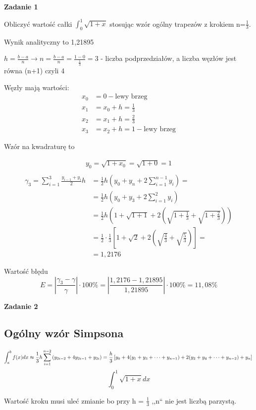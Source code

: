 \documentclass[11pt, a4paper]{article}
\begin{document}
\textbf{Zadanie 1}

Obliczyć wartość całki $\int_0^1\sqrt{1+x}$ stosując wzór ogólny trapezów z krokiem n=$\frac{1}{3}$.


Wynik analityczny to 1,21895

$h=\frac{b-a}{n}\rightarrow n=\frac{b-a}{n}=\frac{1-0}{\frac{1}{3}}=3$ - liczba podprzedziałów,
a liczba węzłów jest równa (n+1) czyli 4

Węzły mają wartości:
\begin{align*}
x_0&=0 - \text{lewy brzeg}\\
x_1&=x_0+h=\frac{1}{3}\\
x_2&=x_1+h=\frac{2}{3}\\
x_3&=x_2+h=1 - \text{lewy brzeg}
\end{align*}

Wzór na kwadraturę to

\begin{gather*}
y_0=\sqrt{1+x_0}=\sqrt{1+0}=1\\
\end{gather*}
\begin{align*}
\gamma_3=\sum_{i=1}^3\frac{y_{i-1}+y_i}{2}h&=\frac{1}{2}h\left(y_0+y_n+2\sum_{i=1}^{n-1}y_i\right)=\\
&=\frac{1}{2}h\left(y_0+y_3+2\sum_{i=1}^2y_i\right)\\
&=\frac{1}{2}h\left(1+\sqrt{1+1}+2\left(\sqrt{1+\frac{1}{3}}+\sqrt{1+\frac{2}{3}}\right)\right)\\
&=\frac{1}{2}\cdot\frac{1}{3}\left[1+\sqrt{2}+2\left(\sqrt{\frac{4}{3}}+\sqrt{\frac{5}{3}}\right)\right]=\\
&=1,2176
\end{align*}

Wartość błędu 
\[
E=\left|\frac{\gamma_3-\gamma}{\gamma}\right|\cdot100\%=\left|\frac{1,2176-1,21895}{1,21895}\right|\cdot100\%=11,08\%
\]


\textbf{Zadanie 2}

\subsection*{Ogólny wzór Simpsona}

\[
\int_a^bf(x)dx\approx\frac{1}{3}h\sum_{i=1}^{n-2}\left(y_{2i-2}+4y_{2i-1}+y_{2i}\right)=\frac{h}{3}\left[y_0+4(y_1+y_3+\dots+y_{n-1})+2(y_2+y_4+\dots+y_{n-2})+y_n\right]\\
\]
\[
\int_0^1\sqrt{1+x}dx
\]

Wartość kroku musi uleć zmianie bo przy h = $\frac{1}{3}$ ,,n`` nie jest liczbą parzystą.
\end{document}
